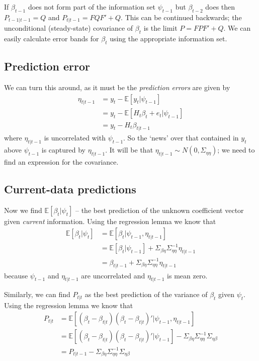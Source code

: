 \documentclass[
  letterpaper,
]{book}
\begin{document}
If \(\beta_{t-1}\) does not form part of the information set
\(\psi_{t-1}\) but \(\beta _{t-2}\) does then \(P_{t-1|t-1}=Q\) and
\(P_{t|t-1}=FQF'+Q\). This can be continued backwards; the unconditional
(steady-state) covariance of \(\beta_t\) is the limit \(P=FPF'+Q\). We
can easily calculate error bands for \(\beta_t\) using the appropriate
information set.

\hypertarget{prediction-error}{%
\subsection{Prediction error}\label{prediction-error}}

We can turn this around, as it must be the \emph{prediction errors} are
given by \begin{align}
\eta_{t|t-1} &= y_t - \mathbb{E}[y_t|\psi_{t-1}]  \\
             &= y_t - \mathbb{E}[H_t\beta_t+e_t|\psi_{t-1}] \\
             &= y_t-H_t\beta_{t|t-1}
\end{align} where \(\eta_{t|t-1}\) is uncorrelated with \(\psi_{t-1}\).
So the `news' over that contained in \(y_t\) above \(\psi_{t-1}\) is
captured by \(\eta_{t|t-1}\). It will be that
\(\eta_{t|t-1}\sim N(0,\Sigma_{\eta\eta})\); we need to find an
expression for the covariance.

\hypertarget{current-data-predictions}{%
\subsection{Current-data predictions}\label{current-data-predictions}}

Now we find \(\mathbb{E}[\beta_t | \psi_t]\) -- the best prediction of
the unknown coefficient vector given \emph{current} information. Using
the regression lemma we know that \begin{align}
\mathbb{E}[\beta_t | \psi_t ] &= \mathbb{E}[\beta_t | \psi_{t-1}, \eta_{t|t-1} ]  \\
&= \mathbb{E}[\beta_t | \psi_{t-1}] +\Sigma_{\beta\eta} \Sigma_{\eta\eta}^{-1}\eta_{t|t-1}  \\
&= \beta_{t|t-1} + \Sigma_{\beta\eta}\Sigma_{\eta\eta}^{-1} \eta_{t|t-1}
\end{align} because \(\psi_{t-1}\) and \(\eta_{t|t-1}\) are uncorrelated
and \(\eta_{t|t-1}\) is mean zero.

Similarly, we can find \(P_{t|t}\) as the best prediction of the
variance of \(\beta_t\) given \(\psi_t\). Using the regression lemma we
know that \begin{align}
P_{t|t} &= \mathbb{E}[(\beta_t-\beta_{t|t})(\beta_t - \beta_{t|t})'|\psi_{t-1}, \eta_{t|t-1}] \\
        &= \mathbb{E}[(\beta_t - \beta_{t|t})(\beta_t-\beta_{t|t})'|\psi_{t-1}] - \Sigma_{\beta\eta}\Sigma_{\eta\eta}^{-1}\Sigma_{\eta\beta} \\
        &=P_{t|t-1}-\Sigma_{\beta\eta} \Sigma_{\eta\eta}^{-1} \Sigma_{\eta\beta} 
\end{align}
\end{document}
